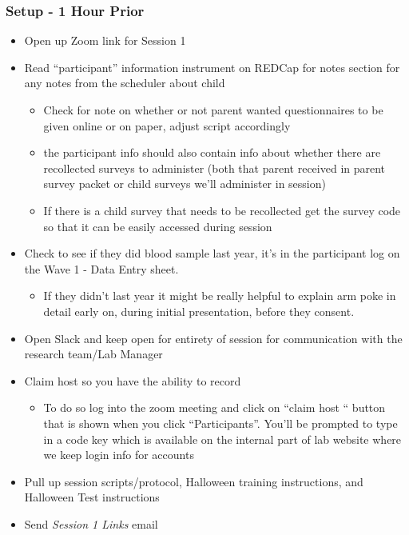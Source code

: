 \documentclass[
]{book}
\providecommand{\tightlist}{%
  \setlength{\itemsep}{0pt}\setlength{\parskip}{0pt}}
\begin{document}
\hypertarget{setup---1-hour-prior-1}{%
\subsubsection{Setup - 1 Hour Prior}\label{setup---1-hour-prior-1}}

\begin{itemize}
\tightlist
\item
  Open up Zoom link for Session 1
\item
  Read ``participant'' information instrument on REDCap for notes section for any notes from the scheduler about child

  \begin{itemize}
  \tightlist
  \item
    Check for note on whether or not parent wanted questionnaires to be given online or on paper, adjust script accordingly
  \item
    the participant info should also contain info about whether there are recollected surveys to administer (both that parent received in parent survey packet or child surveys we'll administer in session)
  \item
    If there is a child survey that needs to be recollected get the survey code so that it can be easily accessed during session
  \end{itemize}
\item
  Check to see if they did blood sample last year, it's in the participant log on the Wave 1 - Data Entry sheet.

  \begin{itemize}
  \tightlist
  \item
    If they didn't last year it might be really helpful to explain arm poke in detail early on, during initial presentation, before they consent.
  \end{itemize}
\item
  Open Slack and keep open for entirety of session for communication with the research team/Lab Manager
\item
  Claim host so you have the ability to record

  \begin{itemize}
  \tightlist
  \item
    To do so log into the zoom meeting and click on ``claim host `` button that is shown when you click ``Participants''. You'll be prompted to type in a code key which is available on the internal part of lab website where we keep login info for accounts
  \end{itemize}
\item
  Pull up session scripts/protocol, Halloween training instructions, and Halloween Test instructions
\item
  Send \emph{Session 1 Links} email


\end{itemize}
\end{document}
